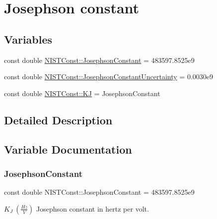 \hypertarget{group___josephson_constant}{}\section{Josephson constant}
\label{group___josephson_constant}
\subsection*{Variables}
\begin{DoxyCompactItemize}
\item 
const double \hyperlink{group___josephson_constant_gae9f3553a6a6c5eed3df61ad33277cab8}{N\+I\+S\+T\+Const\+::\+Josephson\+Constant} = 483597.\+8525e9
\item 
const double \hyperlink{group___josephson_constant_gaa10eadf7c1811f94c5b5725ad300a099}{N\+I\+S\+T\+Const\+::\+Josephson\+Constant\+Uncertainty} = 0.\+0030e9
\item 
const double \hyperlink{group___josephson_constant_ga75e8a1fd7b1434083e96c2f0291eb756}{N\+I\+S\+T\+Const\+::\+KJ} = Josephson\+Constant
\end{DoxyCompactItemize}


\subsection{Detailed Description}


\subsection{Variable Documentation}
\mbox{\label{group___josephson_constant_gae9f3553a6a6c5eed3df61ad33277cab8}} 
\subsubsection{\texorpdfstring{Josephson\+Constant}{JosephsonConstant}}
{\footnotesize\ttfamily const double N\+I\+S\+T\+Const\+::\+Josephson\+Constant = 483597.\+8525e9}

$K_J \ (\frac{Hz}{V})$ Josephson constant in hertz per volt. \mbox{\label{group___josephson_constant_gaa10eadf7c1811f94c5b5725ad300a099}} 
